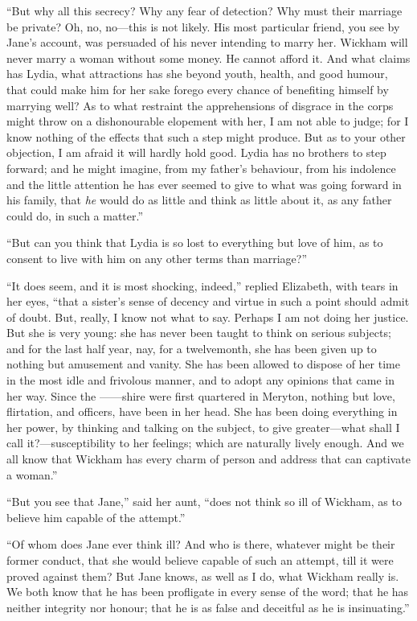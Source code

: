\documentclass[12pt]{book}
\begin{document}
``But why all this secrecy? Why any fear of detection? Why must their marriage be private? Oh, no, no---this is not likely. His most particular friend, you see by Jane's account, was persuaded of his never intending to marry her. Wickham will never marry a woman without some money. He cannot afford it. And what claims has Lydia, what attractions has she beyond youth, health, and good humour, that could make him for her sake forego every chance of benefiting himself by marrying well? As to what restraint the apprehensions of disgrace in the corps might throw on a dishonourable elopement with her, I am not able to judge; for I know nothing of the effects that such a step might produce. But as to your other objection, I am afraid it will hardly hold good. Lydia has no brothers to step forward; and he might imagine, from my father's behaviour, from his indolence and the little attention he has ever seemed to give to what was going forward in his family, that \textit{he} would do as little and think as little about it, as any father could do, in such a matter.''

``But can you think that Lydia is so lost to everything but love of him, as to consent to live with him on any other terms than marriage?''

``It does seem, and it is most shocking, indeed,'' replied Elizabeth, with tears in her eyes, ``that a sister's sense of decency and virtue in such a point should admit of doubt. But, really, I know not what to say. Perhaps I am not doing her justice. But she is very young: she has never been taught to think on serious subjects; and for the last half year, nay, for a twelvemonth, she has been given up to nothing but amusement and vanity. She has been allowed to dispose of her time in the most idle and frivolous manner, and to adopt any opinions that came in her way. Since the ------shire were first quartered in Meryton, nothing but love, flirtation, and officers, have been in her head. She has been doing everything in her power, by thinking and talking on the subject, to give greater---what shall I call it?---susceptibility to her feelings; which are naturally lively enough. And we all know that Wickham has every charm of person and address that can captivate a woman.''

``But you see that Jane,'' said her aunt, ``does not think so ill of Wickham, as to believe him capable of the attempt.''

``Of whom does Jane ever think ill? And who is there, whatever might be their former conduct, that she would believe capable of such an attempt, till it were proved against them? But Jane knows, as well as I do, what Wickham really is. We both know that he has been profligate in every sense of the word; that he has neither integrity nor honour; that he is as false and deceitful as he is insinuating.''
\end{document}
